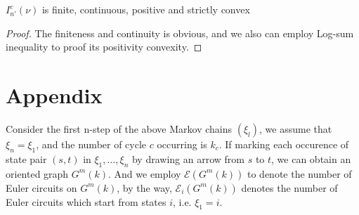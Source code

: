 \documentclass[11pt,en,cite=authoryear]{elegantpaper}
\begin{document}
\begin{corollary}
    $I_{n'}^{c}(\nu)$ is  finite, continuous, positive and strictly convex
\end{corollary}
\begin{proof}
    The finiteness and continuity is obvious, and we also can employ Log-sum inequality to proof its positivity convexity.
\end{proof}

\section{Appendix}
Consider the first n-step of the above Markov chains $(\xi_l)$, we assume that $\xi_{n}=\xi_1$, and the number of cycle $c$ occurring is $k_{c}$.
If marking each occurence of state pair $(s, t)$ in $\xi_1, \dots, \xi_n$ by drawing an arrow from $s$ to $t$, we can obtain an oriented graph $G^m(k)$. And we employ $\mathcal{E} (G^m(k))$ to denote the number of Euler circuits on $G^m(k)$, by the way, $\mathcal{E}_i (G^m(k))$ denotes the number of Euler circuits which start from states $i$, i.e. $\xi_1 = i$.
\end{document}
